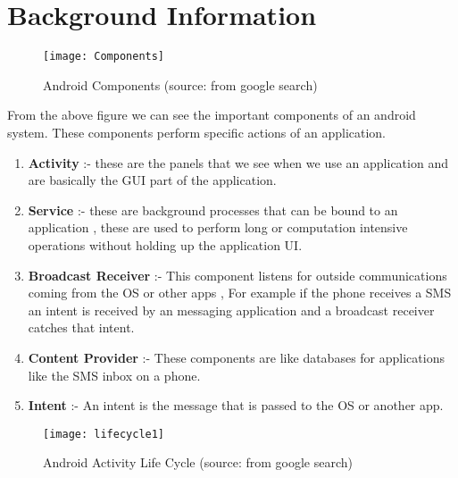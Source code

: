 \documentclass[journal]{IEEEtran}
\begin{document}
\section{Background Information}
\begin{figure}

  \centering
\texttt{[image: Components]} 
  \caption{Android Components (source: from google search)}
\end{figure}

From the above figure we can see the important components of an android system. These components perform specific actions of an application.
\begin{enumerate}
\item \textbf{Activity} :- these are the panels that we see when we use an application and are basically the GUI part of the application.
\item \textbf{Service} :- these are background processes that can be bound to an application , these are used to perform long or computation intensive operations without holding up the application UI.
\item \textbf{Broadcast Receiver} :- This component listens for outside communications coming from the OS or other apps , For example if the phone receives a SMS an intent is received by an messaging application and a broadcast receiver catches that intent. 
\item \textbf{Content Provider} :- These components are like databases for applications like the SMS inbox on a phone.
\item \textbf{Intent} :- An intent is the message that is passed to the OS or another app.
\end{enumerate}

\begin{figure}
  \centering
 \texttt{[image: lifecycle1]} 
  \caption{Android Activity Life Cycle (source: from google search)}
\end{figure}
\end{document}
